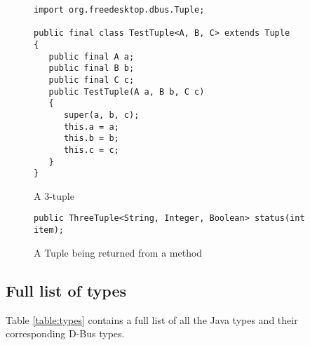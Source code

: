 \documentclass[a4paper,12pt]{article}
\begin{document}
\begin{figure}[htb]
\begin{center}
\begin{verbatim}
import org.freedesktop.dbus.Tuple;

public final class TestTuple<A, B, C> extends Tuple
{
   public final A a;
   public final B b;
   public final C c;
   public TestTuple(A a, B b, C c)
   {
      super(a, b, c);
      this.a = a;
      this.b = b;
      this.c = c;
   }
}
\end{verbatim}
\end{center}
\caption{A 3-tuple}
\label{fig:tuple}
\end{figure}

\begin{figure}[htb]
\begin{center}
\begin{verbatim}
public ThreeTuple<String, Integer, Boolean> status(int item);
\end{verbatim}
\end{center}
\caption{A Tuple being returned from a method}
\label{fig:tuplemethod}
\end{figure}

\subsection{Full list of types}

Table \ref{table:types} contains a full list of all the Java types and their corresponding D-Bus types.
\end{document}
